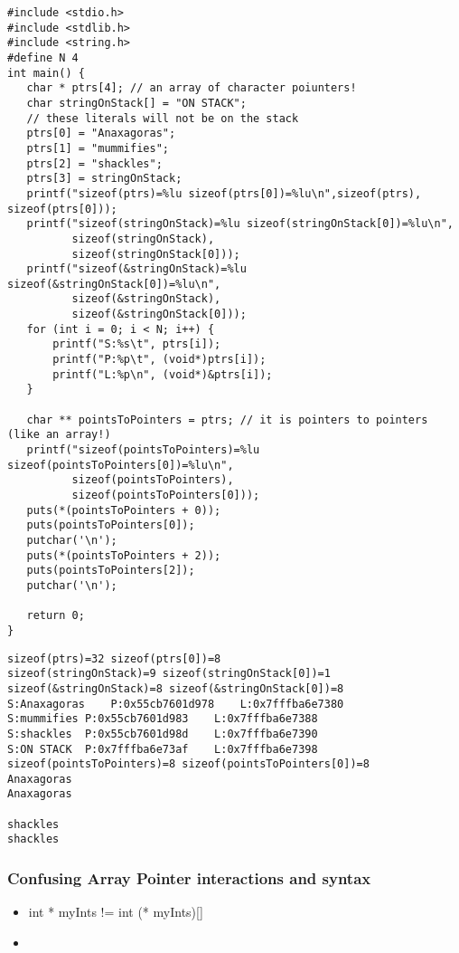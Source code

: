 \documentclass[11pt]{article}
\begin{document}
\begin{verbatim}
#include <stdio.h>
#include <stdlib.h>
#include <string.h>
#define N 4
int main() {
   char * ptrs[4]; // an array of character poiunters!
   char stringOnStack[] = "ON STACK";
   // these literals will not be on the stack
   ptrs[0] = "Anaxagoras";
   ptrs[1] = "mummifies";
   ptrs[2] = "shackles";
   ptrs[3] = stringOnStack;
   printf("sizeof(ptrs)=%lu sizeof(ptrs[0])=%lu\n",sizeof(ptrs), sizeof(ptrs[0]));
   printf("sizeof(stringOnStack)=%lu sizeof(stringOnStack[0])=%lu\n",
          sizeof(stringOnStack), 
          sizeof(stringOnStack[0]));
   printf("sizeof(&stringOnStack)=%lu sizeof(&stringOnStack[0])=%lu\n",
          sizeof(&stringOnStack), 
          sizeof(&stringOnStack[0]));
   for (int i = 0; i < N; i++) {
       printf("S:%s\t", ptrs[i]);
       printf("P:%p\t", (void*)ptrs[i]);
       printf("L:%p\n", (void*)&ptrs[i]);
   } 

   char ** pointsToPointers = ptrs; // it is pointers to pointers (like an array!)
   printf("sizeof(pointsToPointers)=%lu sizeof(pointsToPointers[0])=%lu\n",
          sizeof(pointsToPointers), 
          sizeof(pointsToPointers[0]));
   puts(*(pointsToPointers + 0));
   puts(pointsToPointers[0]);
   putchar('\n');
   puts(*(pointsToPointers + 2));
   puts(pointsToPointers[2]);
   putchar('\n');

   return 0;
}
\end{verbatim}

\begin{verbatim}
sizeof(ptrs)=32 sizeof(ptrs[0])=8
sizeof(stringOnStack)=9 sizeof(stringOnStack[0])=1
sizeof(&stringOnStack)=8 sizeof(&stringOnStack[0])=8
S:Anaxagoras	P:0x55cb7601d978	L:0x7fffba6e7380
S:mummifies	P:0x55cb7601d983	L:0x7fffba6e7388
S:shackles	P:0x55cb7601d98d	L:0x7fffba6e7390
S:ON STACK	P:0x7fffba6e73af	L:0x7fffba6e7398
sizeof(pointsToPointers)=8 sizeof(pointsToPointers[0])=8
Anaxagoras
Anaxagoras

shackles
shackles
\end{verbatim}


\subsubsection{Confusing Array Pointer interactions and syntax}
\label{sec:orgf76931c}

\begin{itemize}
\item int * myInts != int (* myInts)[]
\item 
\end{itemize}
\end{document}
